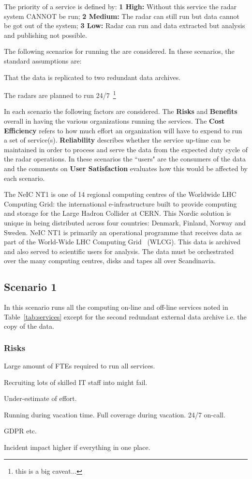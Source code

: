 \documentclass[12pt,a4paper]{article}
\newcommand{\nnt}{NeIC NT1\xspace}
\begin{document}
The priority of a service is defined by: {\bf 1 High:} Without this service the radar system CANNOT be run; {\bf 2 Medium:} The radar can still run but data cannot be got out of the system; {\bf 3 Low:} Radar can run and data extracted but analysis and publishing not possible.

The following scenarios for running the \ED \einfra are considered.
In these scenarios, the standard assumptions are:
\bitm
\item That the \ED data is replicated to two redundant data archives.
\item The \ED radars are planned to run 24/7~\footnote{this is a big caveat...}
\eitm

In each scenario the following factors are considered.
The {\bf Risks} and {\bf Benefits} overall in having the various organizations running the services.
The {\bf Cost Efficiency} refers to how much effort an organization will have to expend to run a set of service(s).
{\bf Reliability} describes whether the service up-time can be maintained in order to process and serve the data from the expected duty cycle of the radar operations.
In these scenarios the ``users" are the consumers of the \ED data and the comments on {\bf User Satisfaction} evaluates how this would be affected by each scenario.

The \nnt is one of 14 regional computing centres of the Worldwide LHC Computing Grid:
the international e-infrastructure built to provide computing and storage for the Large Hadron Collider at CERN.
This Nordic solution is unique in being distributed across four countries: Denmark, Finland, Norway and Sweden.
\nnt is primarily an \einfra operational programme that receives data as part of the World-Wide LHC Computing Grid~\cite{wlcg} (WLCG).
This data is archived and also served to scientific users for analysis.
The data must be orchestrated over the many computing centres, disks and tapes all over Scandinavia.

\subsection{Scenario 1}

In this scenario \EC runs all the computing on-line and off-line services noted in Table~\ref{tab:services} except for the second redundant external data archive i.e. the copy of the \ED data.

\subsubsection*{Risks}
\bitm
\item Large amount of FTEs required to run all services.
\item Recruiting lots of skilled IT staff into \ESA might fail.
\item Under-estimate of effort. 
\item Running during vacation time. Full coverage during vacation. 24/7 on-call.
\item GDPR etc.
\item Incident impact higher if everything in one place.
\eitm
\end{document}
